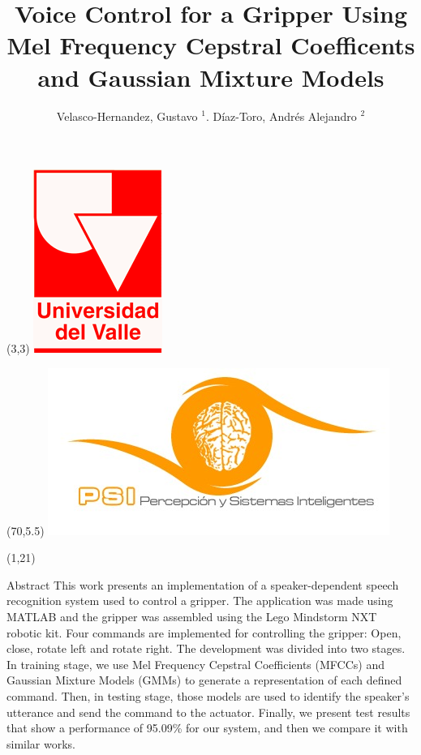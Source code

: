 \documentclass[final]{beamer}
\title{Voice Control for a Gripper Using Mel Frequency Cepstral Coefficents and Gaussian Mixture Models}
\author{Velasco-Hernandez, Gustavo $^{1}$. D\'{i}az-Toro, Andr\'{e}s Alejandro $^{2}$}
\institute{Perception and Intelligent Systems Research Group\\
	School of Electric and Electronics Engineering\\
	Universidad del Valle}
\date{}
\begin{document}
\begin{frame}{}

\begin{textblock}{5}(3,3)
\includegraphics[width=0.10\paperwidth]{figs/univalle.png}
\end{textblock}
\begin{textblock}{5}(70,5.5)
\includegraphics[width=0.08\paperwidth]{figs/psilogo.png}
\end{textblock}


\begin{textblock}{39.5}(1,21)
\begin{block}{Abstract}
This work presents an implementation of a speaker-dependent speech recognition system used to control a gripper. The application was made using MATLAB and the gripper was assembled using the Lego Mindstorm NXT robotic kit. Four commands are implemented for controlling the gripper: Open, close, rotate left and rotate right. The development was divided into two stages. In training stage, we use Mel Frequency Cepstral Coefficients (MFCCs) and Gaussian Mixture Models (GMMs) to generate a representation of each defined command. Then, in testing stage, those models are used to identify the speaker’s utterance and send the command to the actuator. Finally, we present test results that show a performance of 95.09\% for our system, and then we compare it with similar works.
\end{block}


\end{textblock}
\end{frame}
\end{document}
